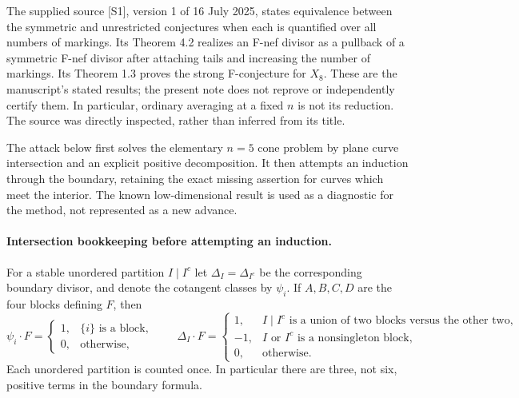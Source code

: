 \documentclass[11pt]{article}
\begin{document}
The supplied source [S1], version 1 of 16 July 2025, states equivalence
between the symmetric and unrestricted conjectures when each is quantified
over all numbers of markings. Its Theorem 4.2 realizes an F-nef divisor as
a pullback of a symmetric F-nef divisor after attaching tails and increasing
the number of markings. Its Theorem 1.3 proves the strong F-conjecture for
$X_8$. These are the manuscript's stated results; the present note does not
reprove or independently certify them. In particular, ordinary averaging
at a fixed $n$ is not its reduction. The source was directly inspected,
rather than inferred from its title.

The attack below first solves the elementary $n=5$ cone problem by plane
curve intersection and an explicit positive decomposition. It then attempts
an induction through the boundary, retaining the exact missing assertion
for curves which meet the interior. The known low-dimensional result is
used as a diagnostic for the method, not represented as a new advance.

\paragraph{Intersection bookkeeping before attempting an induction.}
For a stable unordered partition $I\mid I^c$ let $\Delta_I=\Delta_{I^c}$
be the corresponding boundary divisor, and denote the cotangent classes by
$\psi_i$. If $A,B,C,D$ are the four blocks defining $F$, then
\begin{equation}\label{ra499:intersections}
 \psi_i\cdot F=\begin{cases}1,&\{i\}\text{ is a block},\\0,&\text{otherwise},\end{cases}
 \qquad
 \Delta_I\cdot F=\begin{cases}
 1,&I\mid I^c\text{ is a union of two blocks versus the other two},\\
 -1,&I\text{ or }I^c\text{ is a nonsingleton block},\\
 0,&\text{otherwise}.
 \end{cases}
\end{equation}
Each unordered partition is counted once. In particular there are three,
not six, positive terms in the boundary formula.
\end{document}

